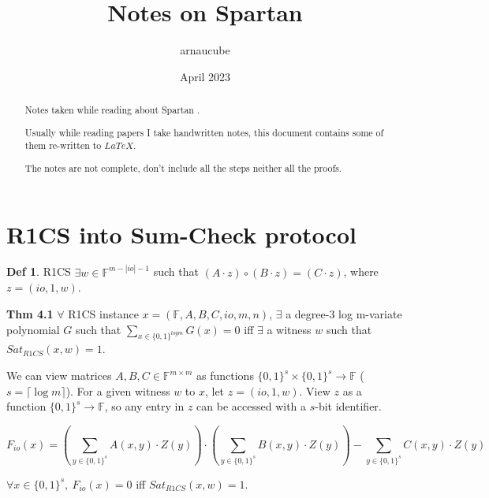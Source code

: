 \documentclass{article}
\title{Notes on Spartan}
\author{arnaucube}
\date{April 2023}
\theoremstyle{definition}
\newtheorem{definition}{Def}[section]
\newtheorem{theorem}[definition]{Thm}
\newenvironment{lemma}[1]
{\renewcommand\theinnerlemma{#1}\innerlemma}
{\endinnerlemma}
\begin{document}
\maketitle

\begin{abstract}
	Notes taken while reading about Spartan \cite{cryptoeprint:2019/550}.

	Usually while reading papers I take handwritten notes, this document contains some of them re-written to $LaTeX$.

	The notes are not complete, don't include all the steps neither all the proofs.
\end{abstract}

\tableofcontents

\section{R1CS into Sum-Check protocol}
\begin{definition}{R1CS}
	$\exists w \in \mathbb{F}^{m - |io| - 1}$ such that $(A \cdot z) \circ (B \cdot z) = (C \cdot z)$, where $z=(io, 1, w)$.
\end{definition}


\textbf{Thm 4.1} $\forall$ R1CS instance $x = (\mathbb{F}, A, B, C, io, m, n)$, $\exists$ a degree-3 log m-variate polynomial $G$ such that $\sum_{x \in \{0,1\}^{log m}} G(x) = 0$ iff $\exists$ a witness $w$ such that $Sat_{R1CS}(x, w)=1$.
\vspace{0.5cm}


We can view matrices $A, B, C \in \mathbb{F}^{m \times m}$ as functions $\{0,1\}^s \times \{0,1\}^s \rightarrow \mathbb{F}$ ($s= \lceil \log m \rceil$).
For a given witness $w$ to $x$, let $z=(io, 1, w)$.
View $z$ as a function $\{0,1\}^s \rightarrow \mathbb{F}$, so any entry in $z$ can be accessed with a $s$-bit identifier.

\begin{small}
$$
F_{io}(x)=\left( \sum_{y \in \{0,1\}^s} A(x, y) \cdot Z(y) \right) \cdot \left( \sum_{y \in \{0,1\}^s} B(x, y) \cdot Z(y) \right) - \sum_{y \in \{0,1\}^s} C(x, y) \cdot Z(y)
$$
\end{small}

\begin{lemma}{4.1}
	$\forall x \in \{0,1\}^s,~ F_{io}(x)=0$ iff $Sat_{R1CS}(x,w)=1$.
\end{lemma}
\end{document}
